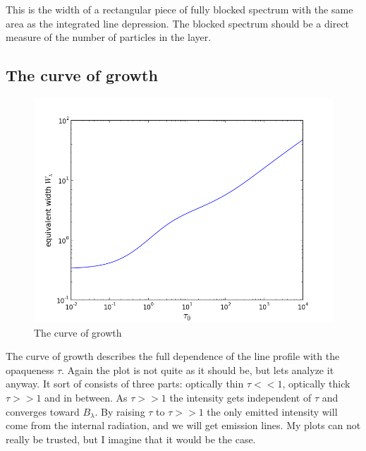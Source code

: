 \documentclass[norsk,a4paper,12pt]{article}
\begin{document}
This is the width of a rectangular piece of fully blocked spectrum with the same area as the integrated line depression.
The blocked spectrum should be a direct measure of the number of particles in the layer.

\subsection{The curve of growth}

\begin{figure}[H] 
\begin{center} 
\includegraphics[scale=0.5]{ssa35.png} 
 

\caption{The curve of growth} 
\end{center} 
\end{figure}


The curve of growth describes the full dependence of the line profile with the opaqueness $\tau $. Again the plot is 
not quite as it should be, but lets analyze it anyway. It sort of consists of three parts: optically thin $\tau<<1 $, 
optically thick $\tau>> 1 $ and in between. As $\tau>>1 $ the intensity gets independent of $\tau $ and converges toward 
$B_{\lambda} $. By raising $\tau $ to $\tau>> 1 $ the only emitted intensity will come from the internal radiation, and 
we will get emission lines. My plots can not really be trusted, but I imagine that it would be the case. 
\end{document}
